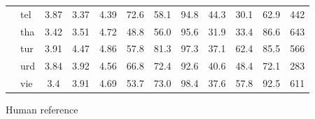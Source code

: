 \begin{threeparttable}
\begin{tabular}{ll|ccc|ccc|ccc|c}
 & tel & 3.87 & 3.37 & 4.39 & 72.6 & 58.1 & 94.8 & 44.3 & 30.1 & 62.9 & 442 \\
 & tha & 3.42 & 3.51 & 4.72 & 48.8 & 56.0 & 95.6 & 31.9 & 33.4 & 86.6 & 643 \\
 & tur & 3.91 & 4.47 & 4.86 & 57.8 & 81.3 & 97.3 & 37.1 & 62.4 & 85.5 & 566 \\
 & urd & 3.84 & 3.92 & 4.56 & 66.8 & 72.4 & 92.6 & 40.6 & 48.4 & 72.1 & 283 \\
 & vie & 3.4 & 3.91 & 4.69 & 53.7 & 73.0 & 98.4 & 37.6 & 57.8 & 92.5 & 611 \\
\bottomrule
\end{tabular}
\begin{tablenotes}
\item[1] \mfourtlg
\item[2] \whisperlarge
\item[3] Human reference
\end{tablenotes}
\end{threeparttable}